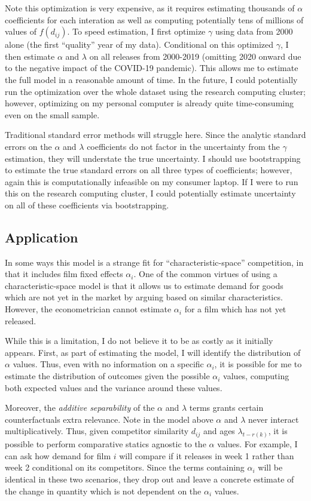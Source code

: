 \documentclass{article}
\begin{document}
Note this optimization is very expensive, as it requires estimating thousands of $\alpha$ coefficients for each interation as well as computing potentially tens of millions of values of $f(d_{ij})$. To speed estimation, I first optimize $\gamma$ using data from 2000 alone (the first ``quality'' year of my data). Conditional on this optimized $\gamma$, I then estimate $\alpha$ and $\lambda$ on all releases from 2000-2019 (omitting 2020 onward due to the negative impact of the COVID-19 pandemic). This allows me to estimate the full model in a reasonable amount of time. In the future, I could potentially run the optimization over the whole dataset using the research computing cluster; however, optimizing on my personal computer is already quite time-consuming even on the small sample.

Traditional standard error methods will struggle here. Since the analytic standard errors on the $\alpha$ and $\lambda$ coefficients do not factor in the uncertainty from the $\gamma$ estimation, they will understate the true uncertainty. I should use bootstrapping to estimate the true standard errors on all three types of coefficients; however, again this is computationally infeasible on my consumer laptop. If I were to run this on the research computing cluster, I could potentially estimate uncertainty on all of these coefficients via bootstrapping. 

\subsection{Application}

In some ways this model is a strange fit for ``characteristic-space'' competition, in that it includes film fixed effects $\alpha_i$. One of the common virtues of using a characteristic-space model is that it allows us to estimate demand for goods which are not yet in the market by arguing based on similar characteristics. However, the econometrician cannot estimate $\alpha_i$ for a film which has not yet released.

While this is a limitation, I do not believe it to be as costly as it initially appears. First, as part of estimating the model, I will identify the distribution of $\alpha$ values. Thus, even with no information on a specific $\alpha_i$, it is possible for me to estimate the distribution of outcomes given the possible $\alpha_i$ values, computing both expected values and the variance around these values. 

Moreover, the \emph{additive separability} of the $\alpha$ and $\lambda$ terms grants certain counterfactuals extra relevance. Note in the model above $\alpha$ and $\lambda$ never interact multiplicatively. Thus, given competitor similarity $d_{ij}$ and ages $\lambda_{t - r(k)}$, it is possible to perform comparative statics agnostic to the $\alpha$ values. For example, I can ask how demand for film $i$ will compare if it releases in week 1 rather than week 2 conditional on its competitors. Since the terms containing $\alpha_i$ will be identical in these two scenarios, they drop out and leave a concrete estimate of the change in quantity which is not dependent on the $\alpha_i$ values.
\end{document}

